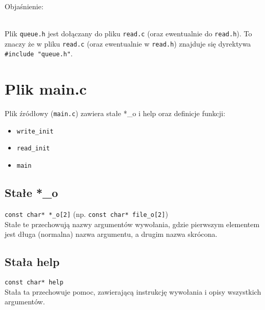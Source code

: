 \documentclass[11pt,a4paper]{report}
\begin{document}
    \\
    \\
    \\
    Objaśnienie:
    \\
    \\
    \begin{center}
    \end{center}
    Plik \verb|queue.h| jest dołączany do pliku \verb|read.c| (oraz ewentualnie do \verb|read.h|). To znaczy że w pliku \verb|read.c| (oraz ewentualnie w \verb|read.h|) znajduje się dyrektywa \verb|#include "queue.h"|.

    \newpage
    \section{Plik main.c}
    Plik źródłowy (\verb|main.c|) zawiera stałe *\_o i help oraz definicje funkcji:
    \begin{itemize}
        \item \verb|write_init|
        \item \verb|read_init|
        \item \verb|main|
    \end{itemize}
    \subsection{Stałe *\_o}
    \verb|const char* *_o[2]| (np. \verb|const char* file_o[2]|)\\
    Stałe te przechowują nazwy argumentów wywołania, gdzie pierwszym elementem jest długa (normalna) nazwa argumentu, a drugim nazwa skrócona.\\
    \subsection{Stała help}
    \verb|const char* help|\\
    Stała ta przechowuje pomoc, zawierającą instrukcję wywołania i opisy wszystkich argumentów.\\
\end{document}
